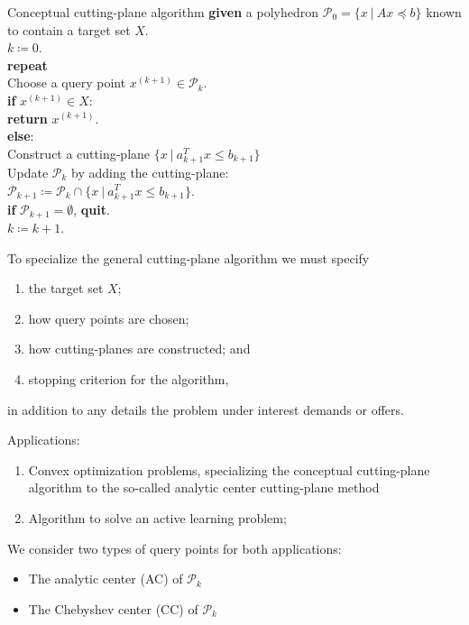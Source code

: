 \documentclass[pdf, 12pt]
{beamer}
\theoremstyle{definition}
\theoremstyle{remark}
\newcommand{\ind}{\hspace*{0.5cm}}
\newcommand{\transpose}{T}
\begin{document}
\begin{frame}{Conceptual cutting-plane algorithm}
      \ind \textbf{given} a polyhedron $\mathcal{P}_0 = \{x \:|\: Ax \preceq b\}$ known to contain a target set $X$. \\
      \ind $k \coloneqq 0$. \\
      \ind \textbf{repeat} \\
      \ind\ind Choose a query point $x^{(k+1)} \in \mathcal{P}_k$. \\
      \ind\ind \textbf{if} $x^{(k+1)} \in X$: \\
      \ind\ind\ind\textbf{return} $x^{(k+1)}$. \\
      \ind\ind \textbf{else}: \\
      \ind\ind\ind Construct a cutting-plane $\{x \:|\: a_{k+1}^\transpose x \leq b_{k+1} \}$ \\
      \ind\ind\ind Update $\mathcal{P}_k$ by adding the cutting-plane: \\ 
      \ind\ind\ind $\mathcal{P}_{k+1} \coloneqq \mathcal{P}_k \cap \{x \:|\: a_{k+1}^\transpose x \leq b_{k+1} \}$. \\
      \ind\ind \textbf{if} $\mathcal{P}_{k+1} = \emptyset$, \textbf{quit}. \\
      \ind\ind $k \coloneqq k+1$.
\end{frame}

\begin{frame}
      To specialize the general cutting-plane algorithm we must specify
  \begin{enumerate}
      \item the target set $X$;
      \item how query points are chosen; 
      \item how cutting-planes are constructed; and
      \item stopping criterion for the algorithm, 
  \end{enumerate}
  in addition to any details the problem under interest demands or offers. 
\end{frame}

\begin{frame}
      Applications:
      \begin{enumerate}
      \item Convex optimization problems, specializing the conceptual cutting-plane algorithm to the so-called analytic center cutting-plane method
      \item Algorithm to solve an active learning problem;  
  \end{enumerate}
      We consider two types of query points for both applications:
      \begin{itemize}
            \item The analytic center (AC) of $\mathcal{P}_k$
            \item The Chebyshev center (CC) of $\mathcal{P}_k$
      \end{itemize}
\end{frame}
\end{document}

